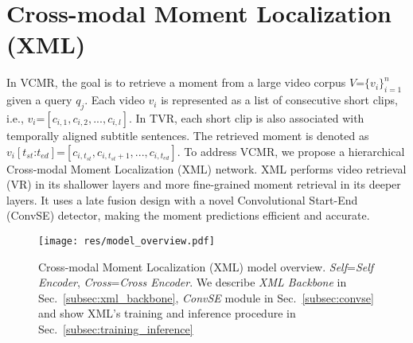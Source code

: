 \documentclass[runningheads]{llncs}
\begin{document}
 \section{Cross-modal Moment Localization (XML)}\label{sec:methods}

In VCMR, the goal is to retrieve a moment from a large video corpus $V\mbox{=} \{v_i\}_{i=1}^{n}$ given a query $q_j$. 
Each video $v_i$ is represented as a list of consecutive short clips, i.e., $v_i \mbox{=} [c_{i, 1}, c_{i, 2}, ..., c_{i, l}]$. In TVR, each short clip is also associated with temporally aligned subtitle sentences.
The retrieved moment is denoted as $v_i[t_{st}\text{:}t_{ed}] \mbox{=} [c_{i, t_{st}}, c_{i, t_{st}+1}, ..., c_{i, t_{ed}}]$.
To address VCMR, we propose a hierarchical Cross-modal Moment Localization (XML) network. 
XML performs video retrieval (VR) in its shallower layers and more fine-grained moment retrieval in its deeper layers.
It uses a late fusion design with a novel Convolutional Start-End (ConvSE) detector, making the moment predictions efficient and accurate.


\begin{figure*}[!t]
  \centering
  \texttt{[image: res/model\_overview.pdf]}
  \caption{Cross-modal Moment Localization (XML) model overview. \textit{Self}=\textit{Self Encoder}, \textit{Cross}=\textit{Cross Encoder}.  We describe \textit{XML Backbone} in Sec.~\ref{subsec:xml_backbone}, \textit{ConvSE} module in Sec.~\ref{subsec:convse} and show XML's training and inference procedure in Sec.~\ref{subsec:training_inference}}
  \label{fig:model_overview}
\end{figure*}
\end{document}
